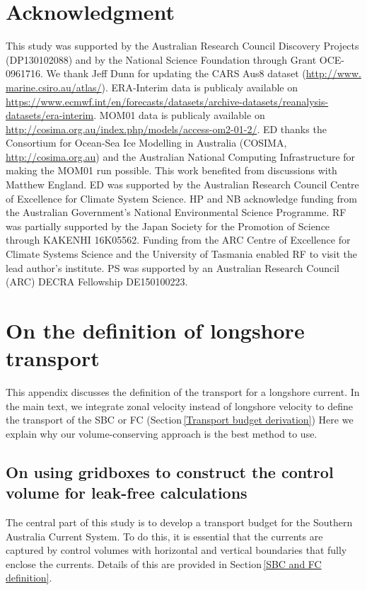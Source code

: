 \documentclass[preprint,3p,review,12pt]{elsarticle}
\begin{document}
\section{Acknowledgment}
This study was supported by the Australian Research Council Discovery Projects (DP130102088) and by the National Science Foundation through Grant OCE-0961716. We thank Jeff Dunn for updating the CARS Aus8 dataset (\url{http://www. marine.csiro.au/atlas/}). ERA-Interim data is publicaly available on \url{https://www.ecmwf.int/en/forecasts/datasets/archive-datasets/reanalysis-datasets/era-interim}. MOM01 data is publicaly available on \url{http://cosima.org.au/index.php/models/access-om2-01-2/}. ED thanks the Consortium for Ocean-Sea Ice Modelling in Australia (COSIMA, \url{http://cosima.org.au}) and the Australian National Computing Infrastructure for making the MOM01 run possible. This work benefited from discussions with Matthew England. ED was supported by the Australian Research Council Centre of Excellence for Climate System Science. HP and NB acknowledge funding from the Australian Government's National Environmental Science Programme. RF was partially supported by the Japan Society for the Promotion of Science through KAKENHI 16K05562.
Funding
  from the ARC Centre of Excellence for Climate Systems Science
  and the University of Tasmania enabled RF to visit the lead author's
  institute.
PS was supported by an Australian Research Council (ARC) DECRA Fellowship DE150100223.

\appendix
\setcounter{figure}{0}
\section{On the definition of longshore transport} \label{Reasoning for defining the SBC transport and the FC transport from their zonal transport}
This appendix discusses the definition of the transport for a longshore current. In the main text, we integrate zonal velocity instead of longshore velocity to define the transport of the SBC or FC (Section\,\ref{Transport budget derivation}) Here we explain why our volume-conserving approach is the best method to use.

\subsection{On using gridboxes to construct the control volume for leak-free calculations}
The central part of this study is to develop a transport budget for the Southern Australia Current System. To do this, it is essential that the currents are captured by control volumes with horizontal and vertical boundaries that fully enclose the currents. Details of this are provided in Section\,\ref{SBC and FC definition}.
\end{document}
